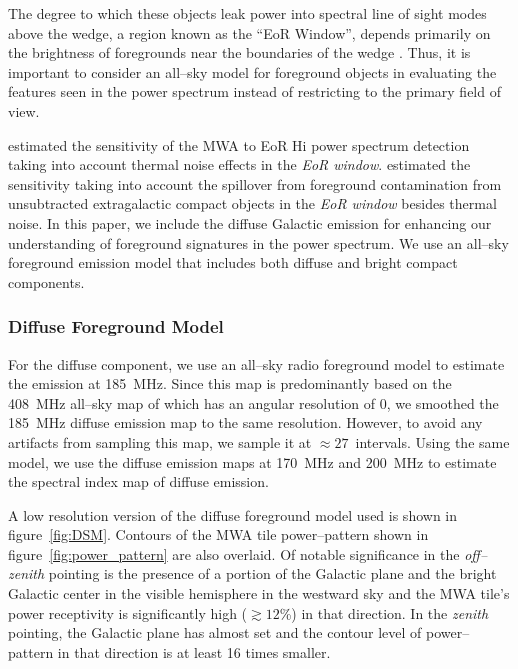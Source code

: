 \documentclass[preprint2,iop,numberedappendix]{emulateapj}
\begin{document}
The degree to which these objects leak power into spectral line of sight modes above the wedge, a region known as the ``EoR Window'', depends primarily on the brightness of foregrounds near the boundaries of the wedge \citep{thy13,pob13,ved12,par12}. Thus, it is important to consider an all--sky model for foreground objects in evaluating the features seen in the power spectrum instead of restricting to the primary field of view. 

\citet{bea13} estimated the sensitivity of the MWA to EoR H{\sc i} power spectrum detection taking into account thermal noise effects in the {\it EoR window}. \citet{thy13} estimated the sensitivity taking into account the spillover from foreground contamination from unsubtracted extragalactic compact objects in the {\it EoR window} besides thermal noise. In this paper, we include the diffuse Galactic emission for enhancing our understanding of foreground signatures in the power spectrum. We use an all--sky foreground emission model that includes both diffuse and bright compact components.  

\subsubsection{Diffuse Foreground Model}\label{sec:DSM}

For the diffuse component, we use an all--sky radio foreground model \citep{deo08} to estimate the emission at 185~MHz. Since this map is predominantly based on the 408~MHz all--sky map of \citet{has82} which has an angular resolution of 0, we smoothed the 185~MHz diffuse emission map to the same resolution. However, to avoid any artifacts from sampling this map, we sample it at $\approx 27$\arcmin~intervals. Using the same model, we use the diffuse emission maps at 170~MHz and 200~MHz to estimate the spectral index map of diffuse emission.  

A low resolution version of the diffuse foreground model used is shown in figure~\ref{fig:DSM}. Contours of the MWA tile power--pattern shown in figure~\ref{fig:power_pattern} are also overlaid. Of notable significance in the {\it off--zenith} pointing is the presence of a portion of the Galactic plane and the bright Galactic center in the visible hemisphere in the westward sky and the MWA tile's power receptivity is significantly high ($\gtrsim 12$\%) in that direction. In the {\it zenith} pointing, the Galactic plane has almost set and the contour level of power--pattern in that direction is at least 16 times smaller. 
\end{document}
